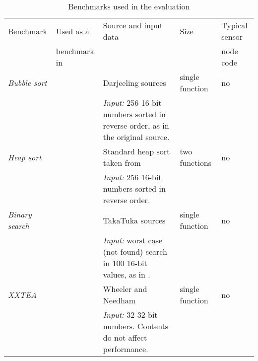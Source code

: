 \begin{table}[h]
\centering
\caption{Benchmarks used in the evaluation}
\label{tbl-benchmarks}
\scriptsize
\begin{tabular}{llp{}ll}
\toprule
Benchmark                & Used as a                                & Source and input data                                                                                      & Size             & Typical sensor \\
                         & benchmark in                             &                                                                                                            &                  & node code \\
\midrule
\midrule
\emph{Bubble sort}       & \cite{Brouwers:2009cj, Ellul:2012thesis} & Darjeeling sources                                                                                         & single function  & no \\
                         &                                          & \emph{Input:} 256 16-bit numbers sorted in reverse order, as in the original source.                       &                  & \\

\emph{Heap sort}         &                                          & Standard heap sort taken from \cite{heapsort}                                                              & two functions    & no \\
                         &                                          & \emph{Input:} 256 16-bit numbers sorted in reverse order.                                                  &                  & \\

\emph{Binary search}     & \cite{Ellul:2012thesis}                  & TakaTuka \cite{Aslam:2008} sources                                                                         & single function  & no \\
                         &                                          & \emph{Input:} worst case (not found) search in 100 16-bit values, as in \cite{Ellul:2012thesis}.           &                  & \\

\emph{XXTEA}             &                                          & Wheeler and Needham \cite{Wheeler:1998}                                                                    & single function  & no \\
                         &                                          & \emph{Input:} 32 32-bit numbers. Contents do not affect performance.                                       &                  & \\


\end{tabular}
\end{table}
